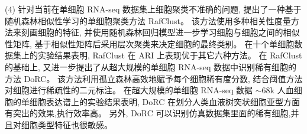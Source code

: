 \begin{abstractcn}
(4) 针对当前在单细胞 RNA-seq 数据集上细胞聚类不准确的问题,
提出了一种基于随机森林相似性学习的单细胞聚类方法 RafClust。
该方法使用多种相关性度量方法来刻画细胞的特征, 
并使用随机森林回归模型进一步学习细胞与细胞之间的相似性矩阵,
基于相似性矩阵后采用层次聚类来决定细胞的最终类别。
在十个单细胞数据集上的实验结果表明, RafClust 在 ARI 上表现优于其它六种方法。
在 RafClust 的基础上, 
又进一步提出了从超大规模的单细胞 RNA-seq 数据中识别稀有细胞的方法 DoRC。
该方法利用孤立森林高效地赋予每个细胞稀有度分数,
结合阈值方法对细胞进行稀疏性的二元标注。
在超大规模的单细胞 RNA-seq 数据 ${\sim}68$k 人血细胞的单细胞表达谱上的实验结果表明,
DoRC 在划分人类血液树突状细胞亚型方面有突出的效果,执行效率高。
另外, DoRC 可以识别仿真数据集里面的稀有细胞,并且对细胞类型特征也很敏感。


\end{abstractcn}
